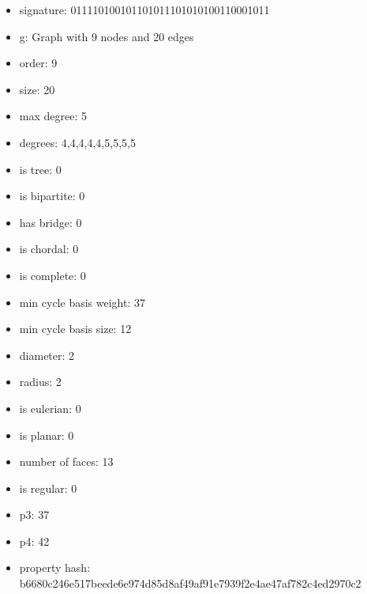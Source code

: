 \newpage
\begin{figure}
\end{figure}
\begin{itemize}
\item signature: 011110100101101011101010100110001011
\item g: Graph with 9 nodes and 20 edges
\item order: 9
\item size: 20
\item max degree: 5
\item degrees: 4,4,4,4,4,5,5,5,5
\item is tree: 0
\item is bipartite: 0
\item has bridge: 0
\item is chordal: 0
\item is complete: 0
\item min cycle basis weight: 37
\item min cycle basis size: 12
\item diameter: 2
\item radius: 2
\item is eulerian: 0
\item is planar: 0
\item number of faces: 13
\item is regular: 0
\item p3: 37
\item p4: 42
\item property hash: b6680c246e517beede6e974d85d8af49af91e7939f2e4ae47af782c4ed2970c2
\end{itemize}
